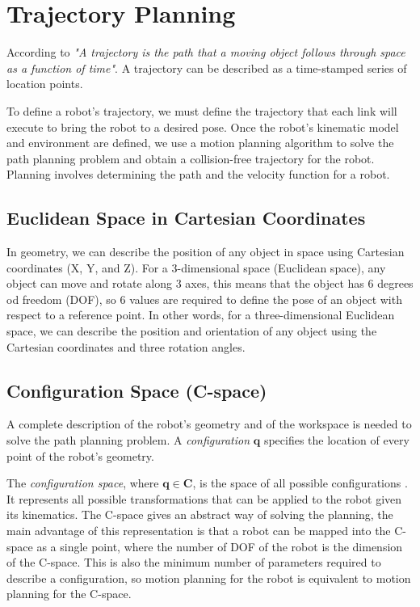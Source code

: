 \section{Trajectory Planning}

According to \citet[chap. 1, page 6]{trajectory} \textit{"A trajectory is the path that a moving object follows through space as a function of time"}. A trajectory can be described as a time-stamped series of location points.

To define a robot's trajectory, we must define the trajectory that each link will execute to bring the robot to a desired pose. Once the robot's kinematic model and environment are defined, we use a motion planning algorithm to solve the path planning problem and obtain a collision-free trajectory for the robot. Planning involves determining the path and the velocity function for a robot. 

\subsection{Euclidean Space in Cartesian Coordinates}

In geometry, we can describe the position of any object in space using Cartesian coordinates (X, Y, and Z). For a 3-dimensional space (Euclidean space), any object can move and rotate along 3 axes, this means that the object has 6 degrees od freedom (DOF), so 6 values are required to define the pose of an object with respect to a reference point. In other words, for a three-dimensional Euclidean space, we can describe the position and orientation of any object using the Cartesian coordinates and three rotation angles.

\subsection{Configuration Space (C-space)}
\label{subsec:cspace}

A complete description of the robot's geometry and of the workspace is needed to solve the path planning problem. A \textit{configuration} $\bm{q}$ specifies the location of every point of the robot's geometry. 

The \textit{configuration space}, where \( \bm{q} \in  \bm{C} \), is the space of all possible configurations \citep{Handbook}. It represents all possible transformations that can be applied to the robot given its kinematics. The C-space gives an abstract way of solving the planning, the main advantage of this representation is that a robot can be mapped into the C-space as a single point, where the number of DOF of the robot is the dimension of the C-space. This is also the minimum number of parameters required to describe a configuration, so motion planning for the robot is equivalent to motion planning for the C-space.


